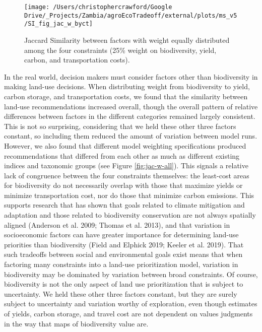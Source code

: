 \documentclass[
]{article}
\begin{document}
\begin{figure}
\texttt{[image: /Users/christophercrawford/Google Drive/\_Projects/Zambia/agroEcoTradeoff/external/plots/ms\_v5/SI\_fig\_jac\_w\_byct]} \caption{Jaccard Similarity between factors with weight equally distributed among the four constraints (25\% weight on biodiversity, yield, carbon, and transportation costs).}\label{fig:jac-w-byct}
\end{figure}

In the real world, decision makers must consider factors other than biodiversity in making land-use decisions. When distributing weight from biodiversity to yield, carbon storage, and transportation costs, we found that the similarity between land-use recommendations increased overall, though the overall pattern of relative differences between factors in the different categories remained largely consistent. This is not so surprising, considering that we held these other three factors constant, so including them reduced the amount of variation between model runs. However, we also found that different model weighting specifications produced recommendations that differed from each other as much as different existing indices and taxonomic groups (see Figure \ref{fig:jac-w-all}). This signals a relative lack of congruence between the four constraints themselves: the least-cost areas for biodiversity do not necessarily overlap with those that maximize yields or minimize transportation cost, nor do those that minimize carbon emissions. This supports research that has shown that goals related to climate mitigation and adaptation and those related to biodiversity conservation are not always spatially aligned (Anderson et al. 2009; Thomas et al. 2013), and that variation in socioeconomic factors can have greater importance for determining land-use priorities than biodiversity (Field and Elphick 2019; Keeler et al. 2019). That such tradeoffs between social and environmental goals exist means that when factoring many constraints into a land-use prioritization model, variation in biodiversity may be dominated by variation between broad constraints. Of course, biodiversity is not the only aspect of land use prioritization that is subject to uncertainty. We held these other three factors constant, but they are surely subject to uncertainty and variation worthy of exploration, even though estimates of yields, carbon storage, and travel cost are not dependent on values judgments in the way that maps of biodiversity value are.

\newpage
\end{document}
